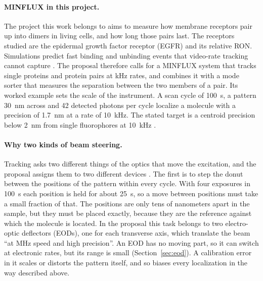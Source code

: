 \documentclass{article}
\begin{document}
\paragraph{MINFLUX in this project.} The project this work belongs to aims to measure how membrane
receptors pair up into dimers in living cells, and how long those pairs last. The receptors studied
are the epidermal growth factor receptor (EGFR) and its relative RON. Simulations predict fast
binding and unbinding events that video-rate tracking cannot capture
\cite{becerraQuantifyingProteinInteractions2024}. The proposal therefore calls for a MINFLUX system
that tracks single proteins and protein pairs at kHz rates, and combines it with a mode sorter that
measures the separation between the two members of a pair. Its worked example sets the scale of the
instrument. A scan cycle of 100~\textmu s, a pattern 30~nm across and 42 detected photons per cycle
localize a molecule with a precision of 1.7~nm at a rate of 10~kHz. The stated target is a
centroid precision below 2~nm from single fluorophores at 10~kHz
\cite{becerraQuantifyingProteinInteractions2024}.

\paragraph{Why two kinds of beam steering.} Tracking asks two different things of the optics that
move the excitation, and the proposal assigns them to two different devices
\cite{becerraQuantifyingProteinInteractions2024}. The first is to step the donut between the
positions of the pattern within every cycle. With four exposures in 100~\textmu s each position is
held for about 25~\textmu s, so a move between positions must take a small fraction of that. The
positions are only tens of nanometers apart in the sample, but they must be placed exactly,
because they are the reference against which the molecule is located. In the proposal this task
belongs to two electro-optic deflectors (EODs), one for each transverse axis, which translate the beam
``at MHz speed and high precision''. An EOD has no moving part, so it can
switch at electronic rates, but its range is small (Section~\ref{sec:eod}). A calibration error in
it scales or distorts the pattern itself, and so biases every localization in the way described
above.
\end{document}

